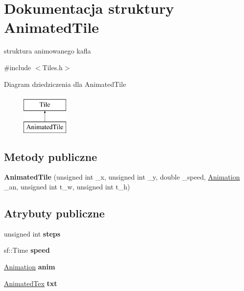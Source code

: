 \hypertarget{struct_animated_tile}{\section{Dokumentacja struktury Animated\-Tile}
\label{struct_animated_tile}
}


struktura animowanego kafla  




{\ttfamily \#include $<$Tiles.\-h$>$}

Diagram dziedziczenia dla Animated\-Tile\begin{figure}[H]
\begin{center}
\leavevmode
\includegraphics[height=2.000000cm]{struct_animated_tile}
\end{center}
\end{figure}
\subsection*{Metody publiczne}
\begin{DoxyCompactItemize}
\item 
\hypertarget{struct_animated_tile_aceb3d448b5632bb74db019e597beedbb}{{\bfseries Animated\-Tile} (unsigned int \-\_\-x, unsigned int \-\_\-y, double \-\_\-speed, \hyperlink{class_animation}{Animation} \-\_\-an, unsigned int t\-\_\-w, unsigned int t\-\_\-h)}\label{struct_animated_tile_aceb3d448b5632bb74db019e597beedbb}

\end{DoxyCompactItemize}
\subsection*{Atrybuty publiczne}
\begin{DoxyCompactItemize}
\item 
\hypertarget{struct_animated_tile_aed6104567115812838040572ff02a3e5}{unsigned int {\bfseries steps}}\label{struct_animated_tile_aed6104567115812838040572ff02a3e5}

\item 
\hypertarget{struct_animated_tile_a85867438fe971f601b34b85544d8a910}{sf\-::\-Time {\bfseries speed}}\label{struct_animated_tile_a85867438fe971f601b34b85544d8a910}

\item 
\hypertarget{struct_animated_tile_a132b1e4eb01d67e5fb7b78cfb7854266}{\hyperlink{class_animation}{Animation} {\bfseries anim}}\label{struct_animated_tile_a132b1e4eb01d67e5fb7b78cfb7854266}

\item 
\hypertarget{struct_animated_tile_a604a41330b7494c623bb2738baa1fb25}{\hyperlink{class_animated_tex}{Animated\-Tex} {\bfseries txt}}\label{struct_animated_tile_a604a41330b7494c623bb2738baa1fb25}

\end{DoxyCompactItemize}


